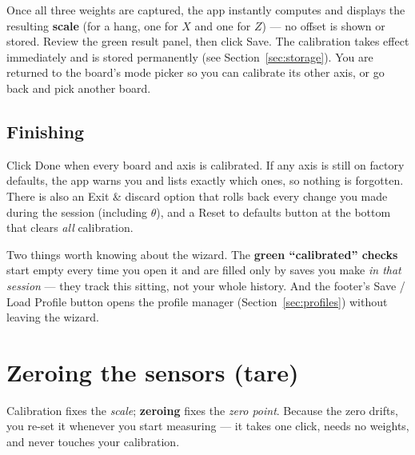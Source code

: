 \documentclass[11pt,a4paper]{article}
\begin{document}
Once all three weights are captured, the app instantly computes and displays the
resulting \textbf{scale} (for a hang, one for $X$ and one for $Z$) --- no offset is
shown or stored. Review the green result panel, then click \textsf{Save}. The
calibration takes effect immediately and is stored permanently (see
Section~\ref{sec:storage}). You are returned to the board's mode picker so you can
calibrate its other axis, or go back and pick another board.


\subsection{Finishing}
Click \textsf{Done} when every board and axis is calibrated. If any axis is still
on factory defaults, the app warns you and lists exactly which ones, so nothing is
forgotten. There is also an \textsf{Exit \& discard} option that rolls back every
change you made during the session (including $\theta$), and a \textsf{Reset to
defaults} button at the bottom that clears \emph{all} calibration.

\begin{infobox}
Two things worth knowing about the wizard. The \textbf{green ``calibrated'' checks}
start empty every time you open it and are filled only by saves you make \emph{in
that session} --- they track this sitting, not your whole history. And the footer's
\textsf{Save / Load Profile} button opens the profile manager
(Section~\ref{sec:profiles}) without leaving the wizard.
\end{infobox}

\section{Zeroing the sensors (tare)}
\label{sec:zeroing}

Calibration fixes the \emph{scale}; \textbf{zeroing} fixes the \emph{zero point}.
Because the zero drifts, you re-set it whenever you start measuring --- it takes one
click, needs no weights, and never touches your calibration.

\end{document}
